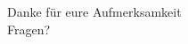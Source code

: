 \documentclass[10pt]{beamer}
\begin{document}
{\nologo
%        
%        

  \begin{frame}[standout]
  Danke für eure Aufmerksamkeit \\ Fragen?
  \end{frame}
}
\end{document}

